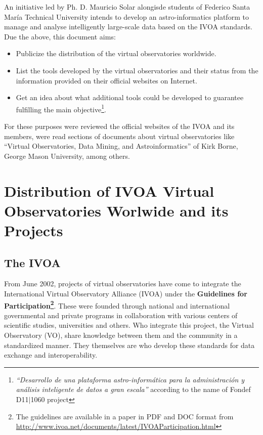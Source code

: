 \documentclass[11pt]{article}
\begin{document}
        An initiative led by Ph. D. Mauricio Solar alongisde students of
Federico Santa Mar\'{i}a Technical University intends to develop an
astro-informatics platform to manage and analyse intelligently large-scale data
based on the IVOA standards. Due the above, this document aims:

        \begin{itemize}
            \item Publicize the distribution of the virtual observatories
worldwide.
            \item List the tools developed by the virtual observatories and
their status from the information provided on their official websites on
Internet.
            \item Get an idea about what additional tools could be developed to
guarantee fulfilling the main objective\footnote{\textit{``Desarrollo de una
plataforma astro-inform\'{a}tica para la administraci\'{o}n y an\'{a}lisis
inteligente de datos a gran escala''} according to the name of Fondef D11$ \vert
$1060 project}.
        \end{itemize}

        For these purposes were reviewed the official websites of the IVOA and its
members, were read sections of documents about virtual observatories like
``Virtual Observatories, Data Mining, and Astroinformatics'' of Kirk Borne,
George Mason University, among others.\\
        
    \section{Distribution of IVOA Virtual Observatories Worlwide and its
Projects}
        \subsection{The IVOA}
            From June 2002, projects of virtual observatories have come to
integrate the International Virtual Observatory Alliance (IVOA) under the
\textbf{Guidelines for Participation\footnote{The guidelines are available in a
paper in PDF and DOC format from
\url{http://www.ivoa.net/documents/latest/IVOAParticipation.html}}}. These were
founded through national and international governmental and private programs in
collaboration with various centers of scientific studies, universities and
others. Who integrate this project, the Virtual Observatory (VO), share
knowledge between them and the community in a standardized manner. They
themselves are who develop these standards for data exchange and
interoperability.\\
\end{document}
